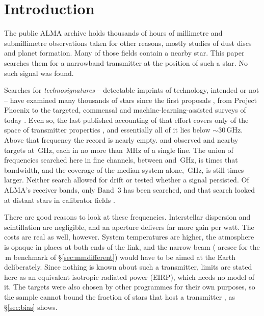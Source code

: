 \section{Introduction}
\label{sec:intro}

The public ALMA archive holds thousands of hours of millimetre and
submillimetre observations taken for other reasons, mostly studies of dust
discs and planet formation. Many of those fields contain a nearby star.
This
paper searches them for a narrowband transmitter at the position of such a
star. No such signal was found.

Searches for \emph{technosignatures} -- detectable imprints of technology,
intended or not \citep{Sheikh2020,SETIreview2025} -- have examined many
thousands of stars since the first proposals
\citep{CocconiMorrison1959,Drake1960}, from Project Phoenix
\citep{Tarter2001,Backus2002} to the targeted, commensal and
machine-learning-assisted surveys of today
\citep{Zhang2020,Czech2021,FAST3IATLAS2025,LOFARdualsite2023,Choza2024,Morrison2023,Tremblay2024,SRT2025,Ma2023,GLOBULAR2025,AnomalyParkesGBT2025}.
Even so, the last published accounting of that effort covers only
\HaystackFrac{} of the space of transmitter properties \citep{Wright2018},
and essentially all of it lies below ${\sim}30$\,GHz. Above that frequency
the record is nearly empty. \citet{Steffes1994} and \citet{Mauersberger1996}
observed \SbPriorNStarA{} and \SbPriorNStarB{} nearby targets at
\SbPriorFreqGHz\,GHz, each in no more than \SbPriorBandMHz\,MHz of a single
line. The union of frequencies searched here in fine channels, between
\SurvFreqLoA{} and \SurvFreqHiA\,GHz, is \SbPriorRatio{} times that bandwidth, and the coverage of the median system alone, \SysUnionAMed\,GHz,
is still \SbPriorRatioSysMed{} times larger. Neither search allowed for drift or tested whether a signal
persisted. Of ALMA's receiver bands, only Band~3 has been searched, and that search
looked at distant stars in calibrator fields \citep{Mason2025}.

There are good reasons to look at these frequencies. Interstellar dispersion
and scintillation are negligible, and an aperture delivers far more gain per
watt. The costs are real as well, however. System temperatures are higher,
the atmosphere is opaque in places at both ends of the link, and the narrow
beam (\BmArcsec{} arcsec for the \BenchDiam\,m benchmark of
\S\ref{sec:mmdifferent}) would have to be aimed at the Earth deliberately.
Since nothing is known about such a transmitter, limits are stated here as
an equivalent isotropic radiated power (EIRP), which needs no model of it.
The targets were also chosen by other programmes for their own purposes, so
the sample cannot bound the fraction of stars that host a transmitter
\citep{Wright2018,Margot2023,EarthDetectingEarth2025}, as \S\ref{sec:bias}
shows.

